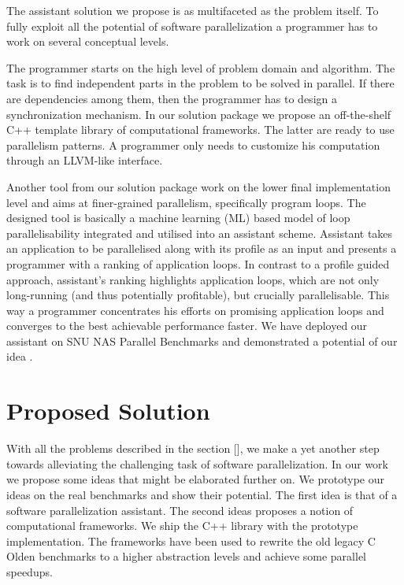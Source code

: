 \quad The assistant solution we propose is as multifaceted as the problem itself. To fully exploit all the potential of software parallelization a programmer has to work on several conceptual levels. 


\quad The programmer starts on the high level of problem domain and algorithm. The task is to find independent parts in the problem to be solved in parallel. If there are dependencies among them, then the programmer has to design a synchronization mechanism. In our solution package we propose an off-the-shelf C++ template library of computational frameworks. The latter are ready to use parallelism patterns. A programmer only needs to customize his computation through an LLVM-like interface.


\quad Another tool from our solution package work on the lower final implementation level and aims at finer-grained parallelism, specifically program loops. The designed tool is basically a machine learning (ML) based model of loop parallelisability integrated and utilised into an assistant scheme. Assistant takes an application to be parallelised along with its profile as an input and presents a programmer with a ranking of application loops. In contrast to a profile guided approach, assistant's ranking highlights application loops, which are not only long-running (and thus potentially profitable), but crucially parallelisable. This way a programmer concentrates his efforts on promising application loops and converges to the best achievable performance faster. We have deployed our assistant on SNU NAS Parallel Benchmarks \cite{snu-npb-benchmarks} \cite{nasa-parallel-benchmarks} and demonstrated a potential of our idea \cite{aiseps}.



\section{Proposed Solution}
\quad With all the problems described in the section [], we make a yet another step towards alleviating the challenging task of software parallelization. In our work we propose some ideas that might be elaborated further on. We prototype our ideas on the real benchmarks and show their potential. The first idea is that of a software parallelization assistant. The second ideas proposes a notion of computational frameworks. We ship the C++ library with the prototype implementation. The frameworks have been used to rewrite the old legacy C Olden benchmarks to a higher abstraction levels and achieve some parallel speedups.

